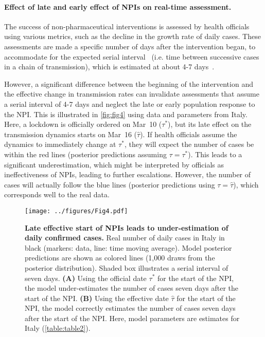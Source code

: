 \documentclass[12pt]{extarticle}
\begin{document}
\paragraph*{Effect of late and early effect of NPIs on real-time assessment.}

The success of non-pharmaceutical interventions is assessed by health officials using various metrics, such as the decline in the growth rate of daily cases. These assessments are made a specific number of days after the intervention began, to accommodate for the expected serial interval~\citep{Banholzer2020} (i.e. time between successive cases in a chain of transmission), which is estimated at about 4-7 days~\citep{Gatto2020}. %

However, a significant difference between the beginning of the intervention and the effective change in transmission rates can invalidate assessments that assume a serial interval of 4-7 days and neglect the late or early population response to the NPI.
This is illustrated in \autoref{fig:fig4} using data and parameters from Italy.
Here, a lockdown is officially ordered on Mar~10 ($\tau^*$), but its late effect on the transmission dynamics starts on Mar~16 ($\hat{\tau}$). If health officials assume the dynamics to immediately change at $\tau^*$, they will expect the number of cases be within the red lines (posterior predictions assuming $\tau=\tau^*$).
This leads to a significant underestimation, which might be interpreted by officials as ineffectiveness of NPIs, leading to further escalations.
However, the number of cases will actually follow the blue lines (posterior predictions using $\tau=\hat{\tau}$), which corresponds well to the real data.


\begin{figure}[h]
    \centering
	\texttt{[image: ../figures/Fig4.pdf]}
    \caption{
    \textbf{Late effective start of NPIs leads to under-estimation of daily confirmed cases.}
    Real number of daily cases in Italy in black (markers: data, line: time moving average). 
    Model posterior predictions are shown as colored lines (1,000 draws from the posterior distribution). 
    Shaded box illustrates a serial interval of seven days.
    \textbf{(A)} Using the official date $\tau^*$ for the start of the NPI,  the model under-estimates the number of cases seven days after the start of the NPI.
    \textbf{(B)} Using the effective date $\hat{\tau}$ for the start of the NPI,  the model correctly estimates the number of cases seven days after the start of the NPI.
    Here, model parameters are estimates for Italy (\autoref{table:table2}).
    } 
    \label{fig:fig4}
\end{figure}
\end{document}
